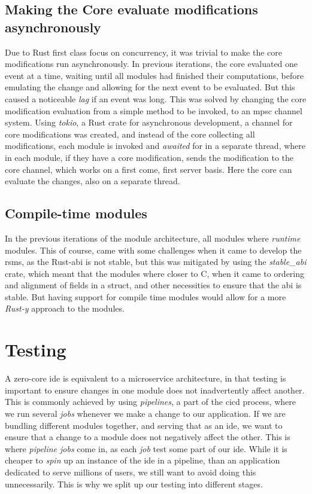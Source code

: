 \subsection{Making the Core evaluate modifications asynchronously}

Due to Rust first class focus on concurrency, it was trivial to make the core
modifications run asynchronously. In previous iterations, the core evaluated
one event at a time, waiting until all modules had finished their computations,
before emulating the change and allowing for the next event to be evaluated. But
this caused a noticeable \textit{lag} if an event was long. This was solved by
changing the core modification evaluation from a simple method to be invoked, to
an \gls*{mpsc} channel system. Using \textit{tokio}, a Rust crate for
asynchronous development, a channel for core modifications was created, and
instead of the core collecting all modifications, each module is invoked and
\textit{awaited} for in a separate thread, where in each module, if they have a
core modification, sends the modification to the core channel, which works on
a first come, first server basis. Here the core can evaluate the changes, also
on a separate thread.

\subsection{Compile-time modules}

In the previous iterations of the module architecture, all modules where
\textit{runtime} modules. This of course, came with some challenges when it came
to develop the \gls*{rsms}, as the Rust-\gls*{abi} is not stable, but this was
mitigated by using the \textit{stable\_abi} crate, which meant that the modules
where closer to C, when it came to ordering and alignment of fields in a struct,
and other necessities to ensure that the \gls*{abi} is stable. But having support
for compile time modules would allow for a more \textit{Rust-y} approach to the
modules.

\section{Testing} \label{sec:testing}

A zero-core \gls*{ide} is equivalent to a microservice architecture, in that
testing is important to ensure changes in one module does not inadvertently
affect another. This is commonly achieved by using \textit{pipelines}, a part
of the \gls*{cicd} process, where we run several \textit{jobs} whenever we make a
change to our application. If we are bundling different modules together, and
serving that as an \gls*{ide}, we want to ensure that a change to a module does
not negatively affect the other. This is where \textit{pipeline jobs} come in,
as each \textit{job} test some part of our \gls*{ide}. While it is cheaper to
\textit{spin} up an instance of the \gls*{ide} in a pipeline, than an application
dedicated to serve millions of users, we still want to avoid doing this
unnecessarily. This is why we split up our testing into different stages.

